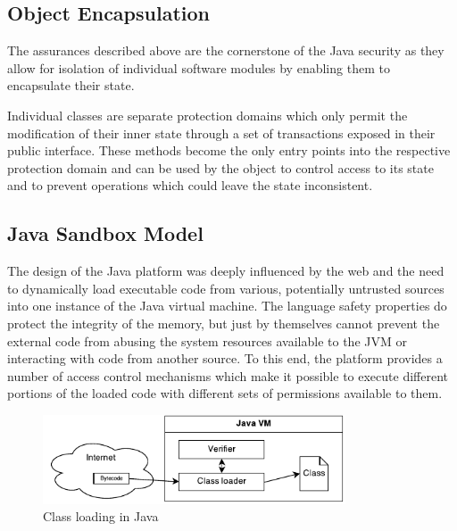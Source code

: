 \documentclass[a4paper,12pt,twoside,openright]{report}
\begin{document}
\subsection{Object Encapsulation}

The assurances described above are the cornerstone of the Java security as they allow for isolation of individual software modules by enabling them to encapsulate their state. 

Individual classes are separate protection domains which only permit the modification of their inner state through a set of transactions exposed in their public interface. These methods become the only entry points into the respective protection domain and can be used by the object to control access to its state and to prevent operations which could leave the state inconsistent.


\subsection{Java Sandbox Model}

The design of the Java platform was deeply influenced by the web and the need to dynamically load executable code from various, potentially untrusted sources into one instance of the Java virtual machine. The language safety properties do protect the integrity of the memory, but just by themselves cannot prevent the external code from abusing the system resources available to the JVM or interacting with code from another source. To this end, the platform provides a number of access control mechanisms which make it possible to execute different portions of the loaded code with different sets of permissions available to them. 

\begin{figure}
	\centering
	\includegraphics[width=0.8\textwidth]{dia_java_classload.pdf}
	\caption{Class loading in Java}
\end{figure}
\end{document}
